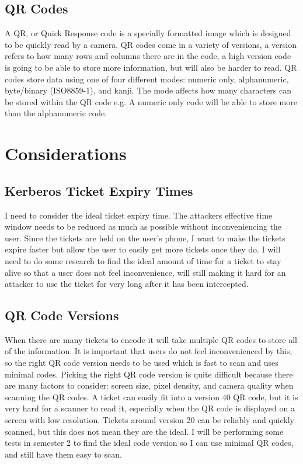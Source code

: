 \documentclass[]{report}   %
\begin{document}
 
\subsection{QR Codes}  
A QR, or Quick Response code \cite{QR} is a specially formatted image which is designed to be quickly read by a camera. QR codes come in a variety of versions, a version refers to how many rows and columns there are in the code, a high version code is going to be able to store more information, but will also be harder to read. QR codes store data using one of four different modes: numeric only, alphanumeric, byte/binary (ISO8859-1), and kanji. The mode affects how many characters can be stored within the QR code e.g. A numeric only code will be able to store more than the alphanumeric code.

\section{Considerations} 
\subsection{Kerberos Ticket Expiry Times} 
I need to consider the ideal ticket expiry time. The attackers effective time window needs to be reduced as much as possible without inconveniencing the user. Since the tickets are held on the user’s phone, I want to make the tickets expire faster but allow the user to easily get more tickets once they do. I will need to do some research to find the ideal amount of time for a ticket to stay alive so that a user does not feel inconvenience, will still making it hard for an attacker to use the ticket for very long after it has been intercepted. 

\subsection{QR Code Versions}
When there are many tickets to encode it will take multiple QR codes to store all of the information. It is important that users do not feel inconvenienced by this, so the right QR code version needs to be used which is fast to scan and uses minimal codes. Picking the right QR code version is quite difficult because there are many factors to consider: screen size, pixel density, and camera quality when scanning the QR codes. A ticket can easily fit into a version 40 QR code, but it is very hard for a scanner to read it, especially when the QR code is displayed on a screen with low resolution. Tickets around version 20 can be reliably and quickly scanned, but this does not mean they are the ideal. I will be performing some tests in semester 2 to find the ideal code version so I can use minimal QR codes, and still have them easy to scan.
\end{document}
